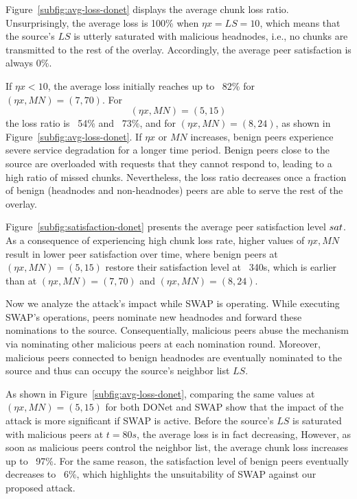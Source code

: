 Figure~\ref{subfig:avg-loss-donet} displays the average chunk loss ratio.
Unsurprisingly, the average loss is 100\% when $\eta x= LS =10$, which means that the source's $LS$ is utterly saturated with malicious headnodes, i.e., no chunks are transmitted to the rest of the overlay.
Accordingly, the average peer satisfaction is always 0\%. 

If $\eta x < 10$, the average loss initially reaches up to ~82\% for $(\eta x, MN)=(7, 70)$. 
For $$(\eta x, MN)=(5, 15)$$ the loss ratio is ~54\% and ~73\%, and for $(\eta x, MN)=(8, 24)$, as shown in Figure~\ref{subfig:avg-loss-donet}.
If $\eta x$ or $MN$ increases, benign peers experience severe service degradation for a longer time period. 
Benign peers close to the source are overloaded with requests that they cannot respond to, leading to a high ratio of missed chunks. 
Nevertheless, the loss ratio decreases once a fraction of benign (headnodes and non-headnodes) peers are able to serve the rest of the overlay.

Figure~\ref{subfig:satisfaction-donet} presents the average peer satisfaction level $sat$.
As a consequence of experiencing high chunk loss rate, higher values of $\eta x, MN$ result in lower peer satisfaction over time, where benign peers at $(\eta x, MN)=(5, 15)$ restore their satisfaction level at ~340s, which is earlier than at $(\eta x, MN)=(7, 70)$ and $(\eta x, MN)=(8, 24)$.

Now we analyze the attack's impact while SWAP is operating.
While executing SWAP's operations, peers nominate new headnodes and forward these nominations to the source. 
Consequentially, malicious peers abuse the mechanism via nominating other malicious peers at each nomination round. 
Moreover, malicious peers connected to benign headnodes are eventually nominated to the source and thus can occupy the source's neighbor list $LS$. 

As shown in Figure~\ref{subfig:avg-loss-donet}, comparing the same values at $(\eta x, MN)=(5, 15)$ for both DONet and SWAP show that the impact of the attack is more significant if SWAP is active.
Before the source's $LS$ is saturated with malicious peers at $t=80s$, the average loss is in fact decreasing, However, as soon as malicious peers control the neighbor list, the average chunk loss increases up to ~97\%. 
For the same reason, the satisfaction level of benign peers eventually decreases to ~6\%, which highlights the unsuitability of SWAP against our proposed attack.

